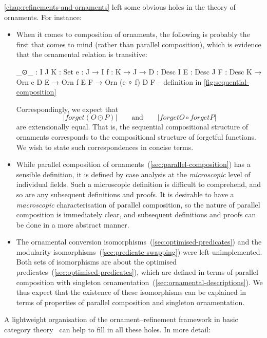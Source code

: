 \autoref{chap:refinements-and-ornaments} left some obvious holes in the theory of ornaments.
For instance:
\begin{itemize}
\item When it comes to composition of ornaments, the following  is probably the first that comes to mind (rather than parallel composition), which is evidence that the ornamental relation is transitive:
\begin{code}
_⊙_ :  {I J K : Set} {e : J → I} {f : K → J} →
       {D : Desc I} {E : Desc J} {F : Desc K} →
       Orn e D E → Orn f E F → Orn (e ∘ f) D F
-- definition in \autoref{fig:sequential-composition}
\end{code}
Correspondingly, we expect that
\[ |forget (O ⊙ P)| \qquad\text{and}\qquad |forget O ∘ forget P| \]
are extensionally equal.
That is, the sequential compositional structure of ornaments corresponds to the compositional structure of forgetful functions.
We wish to state such correspondences in concise terms.
\item While parallel composition of ornaments~(\autoref{sec:parallel-composition}) has a sensible definition, it is defined by case analysis at the \emph{microscopic} level of individual fields.
Such a microscopic definition is difficult to comprehend, and so are any subsequent definitions and proofs.
It is desirable to have a \emph{macroscopic} characterisation of parallel composition, so the nature of parallel composition is immediately clear, and subsequent definitions and proofs can be done in a more abstract manner.
\item The ornamental conversion isomorphisms~(\autoref{sec:optimised-predicates}) and the modularity isomorphisms~(\autoref{sec:predicate-swapping}) were left unimplemented.
Both sets of isomorphisms are about the optimised predicates~(\autoref{sec:optimised-predicates}), which are defined in terms of parallel composition with singleton ornamentation~(\autoref{sec:ornamental-descriptions}).
We thus expect that the existence of these isomorphisms can be explained in terms of properties of parallel composition and singleton ornamentation.
\end{itemize}
A lightweight organisation of the ornament--refinement framework in basic category theory~\citep{MacLane-categories} can help to fill in all these holes.
In more detail:
